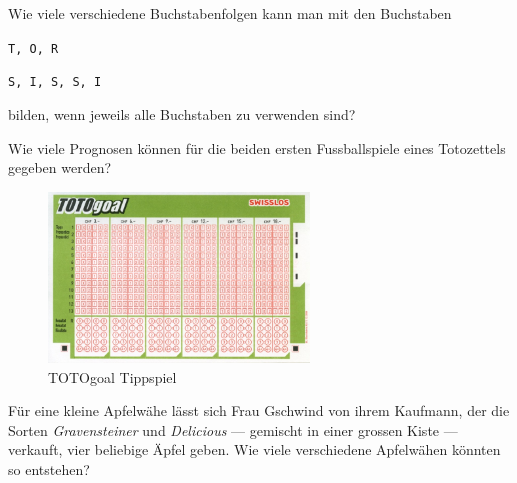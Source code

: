\documentclass[%
11pt,%
twoside,%
titlepage,%
german,%
headsepline%
]{scrartcl}
\begin{document}
\begin{ueb}\label{sissi}
Wie viele verschiedene Buchstabenfolgen kann man mit den Buchstaben
\begin{enumeratea}
\item \texttt{T, O, R}
\item \texttt{S, I, S, S, I}
\end{enumeratea}
bilden, wenn jeweils alle Buchstaben zu verwenden sind?
\end{ueb}

\begin{ueb}[TOTOGoal]
Wie viele Prognosen können für die beiden ersten Fussballspiele eines Totozettels gegeben werden?
\begin{figure}
\begin{center}
\includegraphics[width=0.618\textwidth]{pictures/TotoGoal}
\caption{TOTOgoal Tippspiel}
\end{center}
\end{figure}
\end{ueb}

\begin{ueb}[Öpfuchueche]\label{aepfel}
 Für eine kleine Apfelwähe lässt sich Frau Gschwind von ihrem Kaufmann, der die Sorten \emph{Gravensteiner} und \emph{Delicious} --- gemischt in einer grossen Kiste --- verkauft, vier beliebige Äpfel geben. Wie viele verschiedene Apfelwähen könnten so entstehen?
 \end{ueb}
 
 
  
\end{document}
